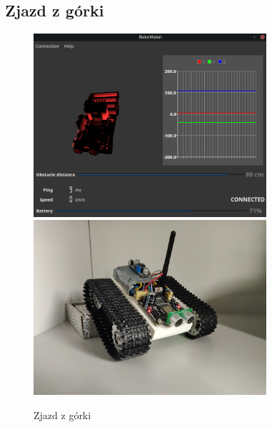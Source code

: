 \documentclass[12pt,a4paper,polish]{article}
\begin{document}
  \subsection{Zjazd z górki}
  \begin{figure}[h]
    \centering
    \includegraphics[width=0.77\textwidth]{img/final/3.png}
    \includegraphics[width=0.77\textwidth]{img/final/3e.jpg}
    \caption{Zjazd z górki}
  \end{figure}


  \newpage
\end{document}
